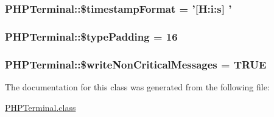 \hypertarget{classPHPTerminal_acf004b637a3868ec6f9b5761a13fa5fc}{
\subsubsection[{\$timestamp\-Format}]{\setlength{\rightskip}{0pt plus 5cm}P\-H\-P\-Terminal\-::\$timestamp\-Format = '\mbox{[}H\-:i\-:s\mbox{]} '\hspace{0.3cm}{\ttfamily [private]}}}\label{classPHPTerminal_acf004b637a3868ec6f9b5761a13fa5fc}
\hypertarget{classPHPTerminal_a81e974fdb09db40fa3eefa2ea040258a}{
\subsubsection[{\$type\-Padding}]{\setlength{\rightskip}{0pt plus 5cm}P\-H\-P\-Terminal\-::\$type\-Padding = 16\hspace{0.3cm}{\ttfamily [private]}}}\label{classPHPTerminal_a81e974fdb09db40fa3eefa2ea040258a}
\hypertarget{classPHPTerminal_a214d1175e6788e5462de0723f75a6706}{
\subsubsection[{\$write\-Non\-Critical\-Messages}]{\setlength{\rightskip}{0pt plus 5cm}P\-H\-P\-Terminal\-::\$write\-Non\-Critical\-Messages = T\-R\-U\-E\hspace{0.3cm}{\ttfamily [private]}}}\label{classPHPTerminal_a214d1175e6788e5462de0723f75a6706}


The documentation for this class was generated from the following file\-:\begin{DoxyCompactItemize}
\item 
\hyperlink{PHPTerminal_8class}{P\-H\-P\-Terminal.\-class}\end{DoxyCompactItemize}
